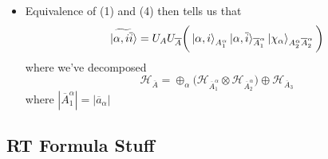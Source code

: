 \documentclass[12pt,a4paper]{article}
\numberwithin{equation}{section}
\newcommand{\ol}[1]{\overline{#1}}
\theoremstyle{definition}
\theoremstyle{theorem}
\theoremstyle{example}
\begin{document}
\begin{itemize}
		\item Equivalence of (1) and (4) then tells us that
		\begin{equation}
			\ket{\widetilde{\alpha,i\ol{i}}}=U_{A}U_{\ol{A}}\bigg(\ket{\alpha,i}_{A_{1}^{\alpha}}\ket{\alpha,\ol{i}}_{\ol{A}_{1}^{\alpha}}\ket{\chi_{\alpha}}_{A_{2}^{\alpha}\ol{A}_{2}^{\alpha}}\bigg)
		\end{equation}
		where we've decomposed
		\begin{equation}
			\mathcal{H}_{\ol{A}}=\oplus_{\alpha}\bigg(\mathcal{H}_{\ol{A}_{1}^{\alpha}}\otimes\mathcal{H}_{\ol{A}_{2}^{\alpha}}\bigg)\oplus\mathcal{H}_{\ol{A}_{3}}
		\end{equation}
		where $|\ol{A}_{1}^{\alpha}|=|\ol{a}_{\alpha}|$
	\end{itemize}
	\subsection{RT Formula Stuff}
\end{document}
